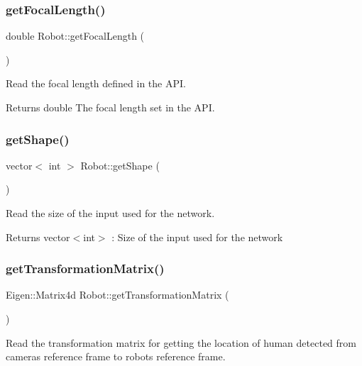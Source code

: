 \subsubsection{\texorpdfstring{get\+Focal\+Length()}{getFocalLength()}}
{\footnotesize\ttfamily double Robot\+::get\+Focal\+Length (\begin{DoxyParamCaption}{ }\end{DoxyParamCaption})}



Read the focal length defined in the A\+PI. 

\begin{DoxyReturn}{Returns}
double The focal length set in the A\+PI. 
\end{DoxyReturn}
\mbox{\label{classRobot_a3a1999a77bc11f070daaa0655ddff66b}} 
\subsubsection{\texorpdfstring{get\+Shape()}{getShape()}}
{\footnotesize\ttfamily vector$<$ int $>$ Robot\+::get\+Shape (\begin{DoxyParamCaption}{ }\end{DoxyParamCaption})}



Read the size of the input used for the network. 

\begin{DoxyReturn}{Returns}
vector$<$int$>$ \+: Size of the input used for the network 
\end{DoxyReturn}
\mbox{\label{classRobot_a0034f52a4daac582470860655f38f734}} 
\subsubsection{\texorpdfstring{get\+Transformation\+Matrix()}{getTransformationMatrix()}}
{\footnotesize\ttfamily Eigen\+::\+Matrix4d Robot\+::get\+Transformation\+Matrix (\begin{DoxyParamCaption}{ }\end{DoxyParamCaption})}



Read the transformation matrix for getting the location of human detected from camera\textquotesingle{}s reference frame to robot\textquotesingle{}s reference frame. 

